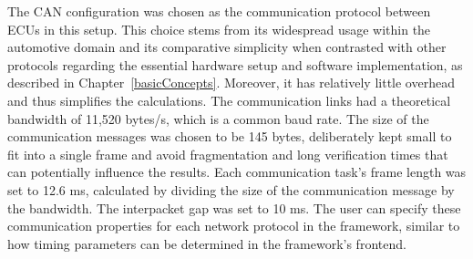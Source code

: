     

    
    
    The CAN configuration was chosen as the communication protocol between ECUs in this setup. This choice stems from its widespread usage within the automotive domain and its comparative simplicity when contrasted with other protocols regarding the essential hardware setup and software implementation, as described in Chapter~\ref{basicConcepts}. Moreover, it has relatively little overhead and thus simplifies the calculations.
    The communication links had a theoretical bandwidth of 11,520 bytes/s, which is a common baud rate. The size of the communication messages was chosen to be 145 bytes, deliberately kept small to fit into a single frame and avoid fragmentation and long verification times that can potentially influence the results. Each communication task's frame length was set to 12.6 ms, calculated by dividing the size of the communication message by the bandwidth. The interpacket gap was set to 10 ms. The user can specify these communication properties for each network protocol in the framework, similar to how timing parameters can be determined in the framework's frontend.




